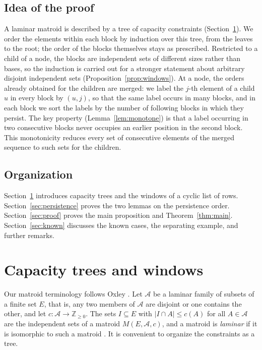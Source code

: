 \documentclass[11pt]{amsart}
\theoremstyle{definition}
\theoremstyle{remark}
\numberwithin{equation}{section}
\newcommand{\Z}{\mathbb{Z}}
\newcommand{\cA}{\mathcal{A}}
\begin{document}
\subsection*{Idea of the proof}
A laminar matroid is described by a tree of capacity constraints (Section~\ref{sec:prelim}). We order the elements within each block by induction over this tree, from the leaves to the root; the order of the blocks themselves stays as prescribed. Restricted to a child of a node, the blocks are independent sets of different sizes rather than bases, so the induction is carried out for a stronger statement about arbitrary disjoint independent sets (Proposition~\ref{prop:windows}). At a node, the orders already obtained for the children are merged: we label the $j$-th element of a child $u$ in every block by $(u,j)$, so that the same label occurs in many blocks, and in each block we sort the labels by the number of following blocks in which they persist. The key property (Lemma~\ref{lem:monotone}) is that a label occurring in two consecutive blocks never occupies an earlier position in the second block. This monotonicity reduces every set of consecutive elements of the merged sequence to such sets for the children.

\subsection*{Organization}
Section~\ref{sec:prelim} introduces capacity trees and the windows of a cyclic list of rows. Section~\ref{sec:persistence} proves the two lemmas on the persistence order. Section~\ref{sec:proof} proves the main proposition and Theorem~\ref{thm:main}. Section~\ref{sec:known} discusses the known cases, the separating example, and further remarks.

\section{Capacity trees and windows}\label{sec:prelim}

Our matroid terminology follows Oxley \cite{Oxley}. Let $\cA$ be a laminar family of subsets of a finite set $E$, that is, any two members of $\cA$ are disjoint or one contains the other, and let $c\colon\cA\to\Z_{\ge0}$. The sets $I\subseteq E$ with $|I\cap A|\le c(A)$ for all $A\in\cA$ are the independent sets of a matroid $M(E,\cA,c)$, and a matroid is \emph{laminar} if it is isomorphic to such a matroid \cite[Section~1]{FO}. It is convenient to organize the constraints as a tree.
\end{document}
